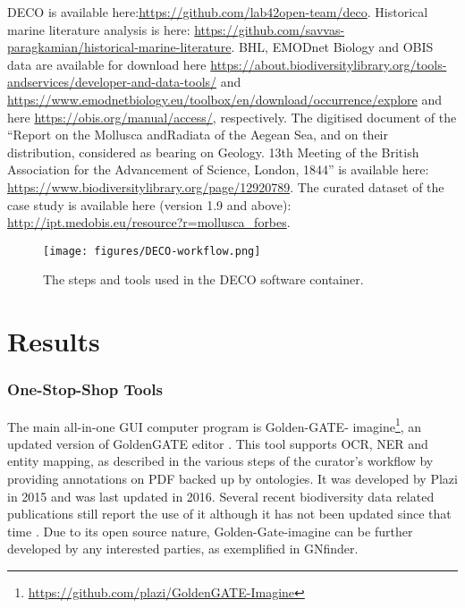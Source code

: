 DECO is available here:\url{https://github.com/lab42open-team/deco}. Historical
marine literature analysis is here:
\href{https://github.com/savvas-paragkamian/historical-marine-literature}{https://github.com/savvas-paragkamian/historical-marine-literature}.
BHL, EMODnet Biology and OBIS data are available for download here
\href{https://about.biodiversitylibrary.org/tools-andservices/developer-and-data-tools/}{https://about.biodiversitylibrary.org/tools-andservices/developer-and-data-tools/}
and \url{https://www.emodnetbiology.eu/toolbox/en/download/occurrence/explore}
and here \url{https://obis.org/manual/access/}, respectively. The digitised
document of the “Report on the Mollusca andRadiata of the Aegean Sea, and on
their distribution, considered as bearing on Geology. 13th Meeting of the
British Association for the Advancement of Science, London, 1844” is available
here: \url{https://www.biodiversitylibrary.org/page/12920789}. The curated
dataset of the case study is available here (version 1.9 and above):
\url{http://ipt.medobis.eu/resource?r=mollusca_forbes}.

   \begin{figure}[ht]
      \centering
      \texttt{[image: figures/DECO-workflow.png]}
      \caption[DECO workflow]{The steps and tools used in the DECO software container.}
      \label{fig:deco-workflow}
   \end{figure}

\section{Results}
\label{sec:deco-results}



   \subsubsection{One-Stop-Shop Tools}
The main all-in-one GUI computer program is Golden-GATE-
imagine\footnote{\url{https://github.com/plazi/GoldenGATE-Imagine}}, an updated
version of GoldenGATE editor \parencite{sautter_semi-automated_2007}. This tool
supports OCR, NER and entity mapping, as described in the various steps of the
curator’s workflow by providing annotations on PDF backed up by ontologies. It
was developed by Plazi in 2015 and was last updated in 2016. Several recent
biodiversity data related publications still report the use of it although it
has not been updated since that time
\parencite{10.3897/biss.3.37078,rivera-quiroz_extracting_2019,10.3897/biss.4.59178}.
Due to its open source nature, Golden-Gate-imagine can be further developed by
any interested parties, as exemplified in GNfinder.


